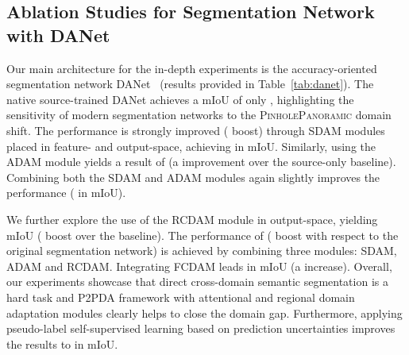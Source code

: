 \documentclass[journal]{IEEEtran}
\begin{document}
\subsection{Ablation Studies for Segmentation Network with DANet}
\label{sec:danet}  
  
Our main architecture for the in-depth experiments is the accuracy-oriented segmentation network DANet~\cite{danet} (results provided in Table~\ref{tab:danet}).
The native source-trained DANet achieves a mIoU of only , highlighting the sensitivity of modern segmentation networks to the \textsc{PinholePanoramic} domain shift.
The performance is strongly improved ( boost) through SDAM modules placed in feature- and output-space, achieving  in mIoU.
Similarly, using the ADAM module yields a result of  (a  improvement over the source-only baseline). 
Combining both the SDAM and ADAM modules again slightly improves the performance ( in mIoU).

We further explore the use of the RCDAM module in output-space, yielding   mIoU ( boost over the baseline).
The performance of  ( boost with respect to the original segmentation network) is achieved by combining three modules: SDAM, ADAM and RCDAM.
Integrating FCDAM leads  in mIoU (a  increase).
Overall, our experiments showcase that  direct cross-domain semantic segmentation is a hard task and P2PDA framework with attentional and regional domain adaptation modules clearly helps to close the domain gap.
Furthermore, applying pseudo-label self-supervised learning based on prediction uncertainties improves the results to  in mIoU.
\end{document}
